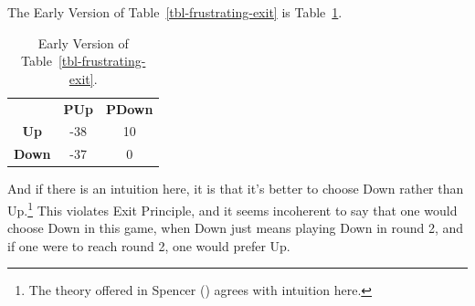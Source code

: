\documentclass[
  12pt,
  letterpaper,
  DIV=11,
  numbers=noendperiod]{scrreprt}
\begin{document}
\begin{table}

\caption{\label{tbl-frustrating-exit}An exit problem with Frustrating
Button in round 2.}

\begin{minipage}[t]{0.50\linewidth}



\end{minipage}%
%
\begin{minipage}[t]{0.50\linewidth}



\end{minipage}%

\end{table}%

The Early Version of Table~\ref{tbl-frustrating-exit} is
Table~\ref{tbl-ev-fe}.

\begin{longtable}[]{@{}ccc@{}}
\caption{Early Version of
Table~\ref{tbl-frustrating-exit}.}\label{tbl-ev-fe}\tabularnewline
\toprule\noalign{}
\endfirsthead
\endhead
\bottomrule\noalign{}
\endlastfoot
& \textbf{PUp} & \textbf{PDown} \\
\textbf{Up} & -38 & 10 \\
\textbf{Down} & -37 & 0 \\
\end{longtable}

\newpage

And if there is an intuition here, it is that it's better to choose Down
rather than Up.\footnote{The theory offered in Spencer
  () agrees with intuition here.} This
violates Exit Principle, and it seems incoherent to say that one would
choose Down in this game, when Down just means playing Down in round 2,
and if one were to reach round 2, one would prefer Up.
\end{document}
